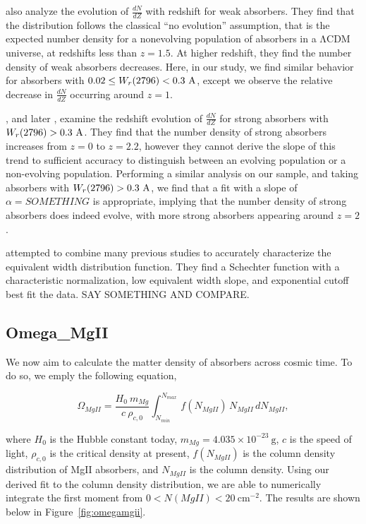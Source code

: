 \documentclass[iop,apj,numberedappendix,appendixfloats,twocolappendix]{emulateapj}
\begin{document}
\cite{Narayanan2007} also analyze the evolution of $\frac{dN}{dZ}$ with redshift for weak {\MgII} absorbers. They find that the distribution follows the classical ``no evolution'' assumption, that is the expected number density for a nonevolving population of absorbers in a $\mathrm{\Lambda CDM}$ universe, at redshifts less than $z = 1.5$. At higher redshift, they find the number density of weak absorbers decreases. Here, in our study, we find similar behavior for absorbers with $0.02 \le W_r(2796) < 0.3~\mathrm{\AA}$, except we observe the relative decrease in $\frac{dN}{dZ}$ occurring around $z = 1$.

\cite{Steidel1992}, and later \cite{Churchill2001}, examine the redshift evolution of $\frac{dN}{dZ}$ for strong {\MgII} absorbers with $W_r(2796) > 0.3~\mathrm{\AA}$. They find that the number density of strong {\MgII} absorbers increases from $z = 0$ to $z = 2.2$, however they cannot derive the slope of this trend to sufficient accuracy to distinguish between an evolving population or a non-evolving population. Performing a similar analysis on our sample, and taking absorbers with $W_r(2796) > 0.3~\mathrm{\AA}$, we find that a fit with a slope of $\alpha = SOMETHING$ is appropriate, implying that the number density of strong {\MgII} absorbers does indeed evolve, with more strong absorbers appearing around $z = 2$.

\cite{Kacprzak2011MgII} attempted to combine many previous studies to accurately characterize the equivalent width distribution function. They find a Schechter function with a characteristic normalization, low equivalent width slope, and exponential cutoff best fit the data. SAY SOMETHING AND COMPARE. 

\subsection{Omega\_MgII}
\label{omegamgii}

We now aim to calculate the matter density of {\MgII} absorbers across cosmic time. To do so, we emply the following equation,

\begin{equation}
\Omega_{MgII} = \frac{H_0\  m_{Mg}}{c\ \rho_{c,0}} \int_{N_{min}}^{N_{max}}\, f (N_{MgII})\, N_{MgII}\, dN_{MgII} ,
\label{eqn:omega}
\end{equation}

where $H_0$ is the Hubble constant today, $m_{Mg} = 4.035 \times 10^{-23}~\mathrm{g}$, $c$ is the speed of light, $\rho_{c,0}$ is the critical density at present, $f(N_{MgII})$ is the column density distribution of {MgII} absorbers, and $N_{MgII}$ is the column density. Using our derived fit to the column density distribution, we are able to numerically integrate the first moment from $0 < N(MgII) < 20~\mathrm{cm^{-2}}$. The results are shown below in Figure~\ref{fig:omegamgii}. 
\end{document}
